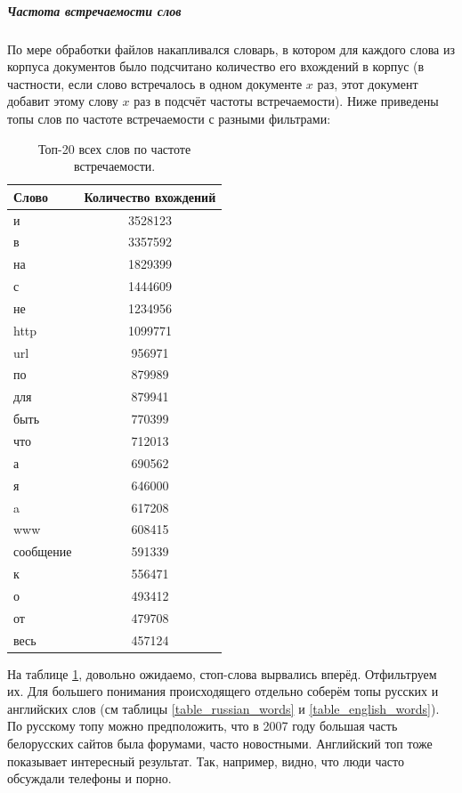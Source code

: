 \subparagraph{Частота встречаемости слов}

По мере обработки файлов накапливался словарь, в котором для каждого слова из корпуса документов было подсчитано количество его вхождений в корпус (в частности, если слово встречалось в одном документе $x$ раз, этот документ добавит этому слову $x$ раз в подсчёт частоты встречаемости). Ниже приведены топы слов по частоте встречаемости с разными фильтрами: 

\begin{table}
	\begin{center}
		\begin{tabular}{|l|c|}
			\hline
			Слово & Количество вхождений\\
			\hline
			и & 3528123 \\
			в &3357592\\
			на &1829399\\
			с &1444609\\
			не &1234956\\
			http& 1099771\\
			url &956971\\
			по &879989\\
			для& 879941\\
			быть& 770399\\
			что &712013\\
			а &690562\\
			я &646000\\
			a &617208\\
			www &608415\\
			сообщение &591339\\
			к &556471\\
			о &493412\\
			от& 479708\\
			весь& 457124\\
			\hline
		\end{tabular}
	\end{center}
	\caption{Топ-20 всех слов по частоте встречаемости.}
	\label{table_all_words_frequency}
\end{table}

На таблице \ref{table_all_words_frequency}, довольно ожидаемо, стоп-слова вырвались вперёд. Отфильтруем их.
Для большего понимания происходящего отдельно соберём топы русских и английских слов (см таблицы \ref{table_russian_words} и \ref{table_english_words}). По русскому топу можно предположить, что в 2007 году большая часть белорусских сайтов была форумами, часто новостными. Английский топ тоже показывает интересный результат. Так, например, видно, что люди часто обсуждали телефоны и порно. 

